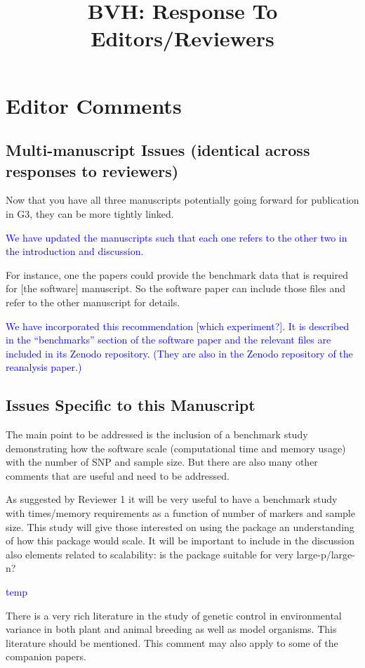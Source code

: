 \documentclass[11pt]{article}
\title{BVH: Response To Editors/Reviewers}
\newcounter{ReviewerNum}
\newcounter{QuestionNum}[ReviewerNum]
\newcommand{\EditorQuestion}[1]{
  \vspace{5pt}\goodbreak
  \noindent\fbox{Editor:} #1
  \normalfont\par
}
\newcommand{\Response}[1]{\textcolor{blue}{#1}}
\begin{document}
\reversemarginpar

\section*{Editor Comments}

\subsection*{Multi-manuscript Issues (identical across responses to reviewers)}

\EditorQuestion{
  Now that you have all three manuscripts potentially going forward for publication in G3, they can be more tightly linked.
}
\Response{
  We have updated the manuscripts such that each one refers to the other two in the introduction and discussion.
}

\EditorQuestion{
   For instance, one the papers could provide the benchmark data that is required for [the software] manuscript.
   So the software paper can include those files and refer to the other manuscript for details.
}
\Response{
  We have incorporated this recommendation [which experiment?].
  It is described in the ``benchmarks'' section of the software paper and the relevant files are included in its Zenodo repository.
  (They are also in the Zenodo repository of the reanalysis paper.)
}



\subsection*{Issues Specific to this Manuscript}

\EditorQuestion{
  The main point to be addressed is the inclusion of a benchmark study demonstrating how the software scale (computational time and memory usage) with the number of SNP and sample size. But there are also many other comments that are useful and need to be addressed.
}

\EditorQuestion{
  As suggested by Reviewer 1 it will be very useful to have a benchmark study with times/memory requirements as a function of number of markers and sample size.
  This study will give those interested on using the package an understanding of how this package would scale.
  It will be important to include in the discussion also elements related to scalability: is the package suitable for very large-p/large-n? 
}
\Response{
  temp
}



\EditorQuestion{
  There is a very rich literature in the study of genetic control in environmental variance in both plant and animal breeding as well as model organisms.
  This literature should be mentioned. This comment may also apply to some of the companion papers.
}
\end{document}
